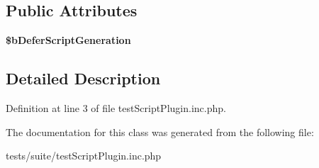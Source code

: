 \subsection*{Public Attributes}
\begin{DoxyCompactItemize}
\item 
\hypertarget{classtestScriptPlugin_a56b21b2d6eb7d97d4e9e290ff7020948}{
{\bfseries \$bDeferScriptGeneration}}
\label{classtestScriptPlugin_a56b21b2d6eb7d97d4e9e290ff7020948}

\end{DoxyCompactItemize}


\subsection{Detailed Description}


Definition at line 3 of file testScriptPlugin.inc.php.



The documentation for this class was generated from the following file:\begin{DoxyCompactItemize}
\item 
tests/suite/testScriptPlugin.inc.php\end{DoxyCompactItemize}
